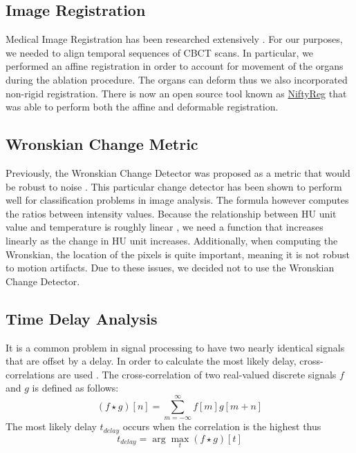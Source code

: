 \documentclass[]{spie}  %
\begin{document}
\subsection{Image Registration}

Medical Image Registration has been researched extensively \cite{Oliveira14, Hill01}. For our purposes, we needed to align temporal sequences of CBCT scans. In particular, we performed an affine registration in order to account for movement of the organs during the ablation procedure. The organs can deform thus we also incorporated non-rigid registration. There is now an open source tool known as \href{http://cmictig.cs.ucl.ac.uk/wiki/index.php/NiftyReg}{NiftyReg} \cite{Ourselin01,Modat10} that was able to perform both the affine \cite{Ourselin01} and deformable \cite{Modat10} registration.   

\subsection{Wronskian Change Metric}

Previously, the Wronskian Change Detector \cite{Durucan01} was proposed as a metric that would be robust to noise \cite{Li13}. This particular change detector has been shown to perform well for classification problems \cite{Panda13,Durucan01,Ang11,Subudhi13} in image analysis. The formula however computes the ratios between intensity values. Because the relationship between HU unit value and temperature is roughly linear \cite{Fani14}, we need a function that increases linearly as the change in HU unit increases. Additionally, when computing the Wronskian, the location of the pixels is quite important, meaning it is not robust to motion artifacts. Due to these issues, we decided not to use the Wronskian Change Detector. 

\subsection{Time Delay Analysis}

It is a common problem in signal processing to have two nearly identical signals that are offset by a delay. In order to calculate the most likely delay, cross-correlations are used \cite{Rhudy09}. The cross-correlation of two real-valued discrete signals $f$ and $g$ is defined as follows:
\[
(f \star g)[n] = \sum_{m=-\infty}^{\infty}{f[m]g[m+n]}
\]
The most likely delay $t_{delay}$ occurs when the correlation is the highest thus
\[
t_{delay} = \arg\max_t (f \star g)[t]
\]
\end{document}
